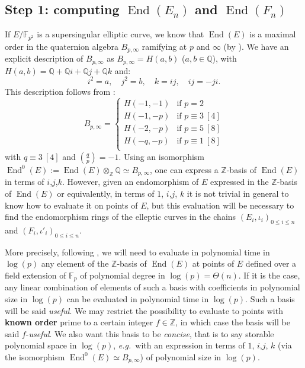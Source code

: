 \documentclass[a4paper,10pt]{report}
\theoremstyle{definition}
\theoremstyle{plain}
\theoremstyle{definition}
\newcommand{\eg}{\emph{e.g.}\ }
\newcommand{\Z}{\mathbb{Z}}
\newcommand{\Q}{\mathbb{Q}}
\newcommand{\F}{\mathbb{F}}
\renewcommand{\(}{\left(}
\renewcommand{\)}{\right)}
\DeclareMathOperator{\End}{End}
\begin{document}
\subsection{Step 1: computing $\End(E_n)$ and $\End(F_n)$}\label{paragraph 6}

If $E/\F_{p^2}$ is a supersingular elliptic curve, we know that $\End(E)$ is a maximal order in the quaternion algebra $B_{p,\infty}$ ramifying at $p$ and $\infty$ (by \cite[Theorem 42.1.9]{Voight}).  We have an explicit description of $B_{p,\infty}$ as $B_{p,\infty}=H(a,b)$ ($a,b\in\Q$), with $H(a,b)=\Q+\Q i+\Q j+\Q k$ and:
\[i^2=a, \quad j^2=b, \quad k=ij,\quad ij=-ji.\]
This description follows from \cite[Proposition 5.1]{Pizer80}:
\[B_{p,\infty}=\left\{\begin{array}{cl}
H(-1,-1) & \mbox{if } p=2\\
H(-1,-p) & \mbox{if } p\equiv 3 \ [4]\\
H(-2,-p)  & \mbox{if } p\equiv 5 \ [8]\\
H(-q,-p)  & \mbox{if } p\equiv 1 \ [8]\\
\end{array}\right.\]
with $q\equiv 3 \ [4]$ and $\(\frac{q}{p}\)=-1$. Using an isomorphism $\End^0(E):=\End(E)\otimes_\Z\Q\simeq B_{p,\infty}$, one can express a $\Z$-basis of $\End(E)$ in terms of $i$,$j$,$k$. However, given an endomorphism of $E$ expressed in the $\Z$-basis of $\End(E)$ or equivalently, in terms of $1$, $i$,$j$, $k$ it is not trivial in general to know how to evaluate it on points of $E$, but this evaluation will be necessary to find the endomorphism rings of the elleptic curves in the chains  $(E_i,\iota_i)_{0\leq i\leq n}$ and $(F_i,\iota'_i)_{0\leq i\leq n}$. 

More precisely, following \cite{LP_merged}, we will need to evaluate in polynomial time in $\log(p)$ any element of the $\Z$-basis of $\End(E)$ at points of $E$ defined over a field extension of $\F_p$ of polynomial degree in $\log(p)=\Theta(n)$. If it is the case,  any linear combination of elements of such a basis with coefficients in polynomial size in $\log(p)$ can be evaluated in polynomial time in $\log(p)$.  Such a basis will be said \emph{useful}.  We may restrict the possibility to evaluate to points with \textbf{known order} prime to a certain integer $f\in\Z$,  in which case the basis will be said $f$-\emph{useful}. We also want this basis to be \emph{concise}, that is to say storable polynomial space in $\log(p)$, \eg with an expression in terms of $1$, $i$,$j$, $k$ (via the isomorphism $\End^0(E)\simeq B_{p,\infty}$) of polynomial size in $\log(p)$. 
\end{document}
